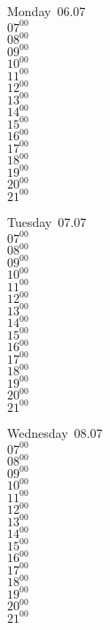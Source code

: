 \documentclass[11pt,a4paper]{book}\usepackage[]{graphicx}\usepackage[]{color}
\begin{document}
\vspace{2 mm}\\
%
%
\begin{tcolorbox}
Monday~06.07\\
{ 
$07^{00}$\\
$08^{00}$\\
$09^{00}$\\
$10^{00}$\\
$11^{00}$\\
$12^{00}$\\
$13^{00}$\\
$14^{00}$\\
$15^{00}$\\
$16^{00}$\\
$17^{00}$\\
$18^{00}$\\
$19^{00}$\\
$20^{00}$\\
$21^{00}$}\\
\end{tcolorbox}
%
\begin{tcolorbox}
Tuesday~07.07\\
{ 
$07^{00}$\\
$08^{00}$\\
$09^{00}$\\
$10^{00}$\\
$11^{00}$\\
$12^{00}$\\
$13^{00}$\\
$14^{00}$\\
$15^{00}$\\
$16^{00}$\\
$17^{00}$\\
$18^{00}$\\
$19^{00}$\\
$20^{00}$\\
$21^{00}$}\\
\end{tcolorbox}
%
\begin{tcolorbox}
Wednesday~08.07\\
{ 
$07^{00}$\\
$08^{00}$\\
$09^{00}$\\
$10^{00}$\\
$11^{00}$\\
$12^{00}$\\
$13^{00}$\\
$14^{00}$\\
$15^{00}$\\
$16^{00}$\\
$17^{00}$\\
$18^{00}$\\
$19^{00}$\\
$20^{00}$\\
$21^{00}$}\\
\end{tcolorbox}
\end{document}
